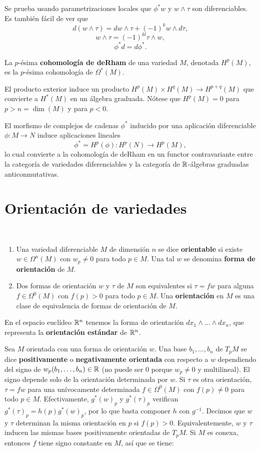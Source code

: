 \documentclass[CV.tex]{subfiles}
\begin{document}
Se prueba usando parametrizaciones locales que $\phi^*w$ y $w\land\tau$ son diferenciables. Es también fácil de ver que
\[
d(w\land\tau)=dw\land\tau+(-1)^kw\land d\tau,
\]
\[
w\land\tau=(-1)^{kl}\tau\land w,
\]
\[
\phi^*d=d\phi^*.
\]

\begin{defi}
La $p$-ésima \textbf{cohomología de deRham} de una variedad $M$, denotada $H^p(M)$, es la $p$-ésima cohomología de $\Omega^*(M)$. 
\end{defi}

El producto exterior induce un producto $H^p(M)\times H^q(M)\to H^{p+q}(M)$ que convierte a $H^*(M)$ en un álgebra graduada. Nótese que $H^p(M)=0$ para $p>n=\dim(M)$ y para $p<0$. 

El morfismo de complejos de cadenas $\phi^*$ inducido por una aplicación diferenciable $\phi:M\to N$ induce aplicaciones lineales
\[
\phi^*=H^p(\phi):H^p(N)\to H^p(M),
\]
lo cual convierte a la cohomología de deRham en un functor contravariante entre la categoría de variedades diferenciables y la categoría de $\mathbb{R}$-álgebras graduadas anticonmutativas.
\newpage
\section{Orientación de variedades}

\begin{defi}\
\begin{enumerate}
\item Una variedad diferenciable $M$ de dimensión $n$ se dice \textbf{orientable} si existe $w\in\Omega^n(M)$ con $w_p\neq 0$ para todo $p\in M$. Una tal $w$ se denomina \textbf{forma de orientación} de $M$.
\item Dos formas de orientación $w$ y $\tau$ de $M$ son equivalentes si $\tau=fw$ para alguna $f\in\Omega^0(M)$ con $f(p)>0$ para todo $p\in M$. Una \textbf{orientación} en $M$ es una clase de equivalencia de formas de orientación de $M$. 
\end{enumerate}
\end{defi}

En el espacio euclídeo $\mathbb{R}^n$ tenemos la forma de orientación $dx_1\land\dots\land dx_n$, que representa la \textbf{orientación estándar} de $\mathbb{R}^n$. 

Sea $M$ orientada con una forma de orientación $w$. Una base $b_1,\dots, b_n$ de $T_pM$ se dice \textbf{positivamente} o \textbf{negativamente  orientada} con respecto a $w$ dependiendo del signo de $w_p(b_1,\dots, b_n)\in\mathbb{R}$ (no puede ser 0 porque $w_p\neq 0$ y multilineal). El signo depende solo de la orientación determinada por $w$. Si $\tau$ es otra orientación, $\tau=fw$ para una unívocamente determinada $f\in\Omega^0(M)$ con $f(p)\neq 0$ para todo $p\in M$. Efectivamente, $g^*(w)_p$ y $g^*(\tau)_p$ verifican $g^*(\tau)_p=h(p)g^*(w)_p$, por lo que basta componer $h$ con $g^{-1}$. Decimos que $w$ y $\tau$ determinan la misma orientación en $p$ si $f(p)>0$. Equivalentemente, $w$ y $\tau$ inducen las mismas bases positivamente orientadas de $T_pM$. Si $M$ es conexa, entonces $f$ tiene signo constante en $M$, así que se tiene:
\end{document}
